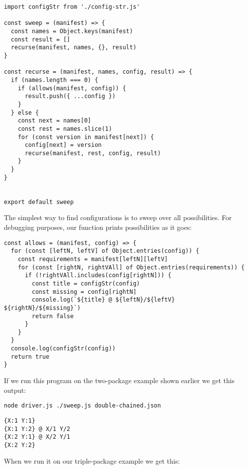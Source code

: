 \documentclass[krantzl]{krantz}
\begin{document}
\begin{lstlisting}[frame=single,frameround=tttt]
import configStr from './config-str.js'

const sweep = (manifest) => {
  const names = Object.keys(manifest)
  const result = []
  recurse(manifest, names, {}, result)
}

const recurse = (manifest, names, config, result) => {
  if (names.length === 0) {
    if (allows(manifest, config)) {
      result.push({ ...config })
    }
  } else {
    const next = names[0]
    const rest = names.slice(1)
    for (const version in manifest[next]) {
      config[next] = version
      recurse(manifest, rest, config, result)
    }
  }
}


export default sweep
\end{lstlisting}



The simplest way to find configurations is to sweep over all possibilities.
For debugging purposes,
our function prints possibilities as it goes:


\begin{lstlisting}[frame=single,frameround=tttt]
const allows = (manifest, config) => {
  for (const [leftN, leftV] of Object.entries(config)) {
    const requirements = manifest[leftN][leftV]
    for (const [rightN, rightVAll] of Object.entries(requirements)) {
      if (!rightVAll.includes(config[rightN])) {
        const title = configStr(config)
        const missing = config[rightN]
        console.log(`${title} @ ${leftN}/${leftV} ${rightN}/${missing}`)
        return false
      }
    }
  }
  console.log(configStr(config))
  return true
}
\end{lstlisting}



If we run this program on the two-package example shown earlier we get this output:


\begin{lstlisting}[frame=single,frameround=tttt]
node driver.js ./sweep.js double-chained.json
\end{lstlisting}



\begin{lstlisting}[frame=single,frameround=tttt]
{X:1 Y:1}
{X:1 Y:2} @ X/1 Y/2
{X:2 Y:1} @ X/2 Y/1
{X:2 Y:2}
\end{lstlisting}



When we run it on our triple-package example we get this:
\end{document}
